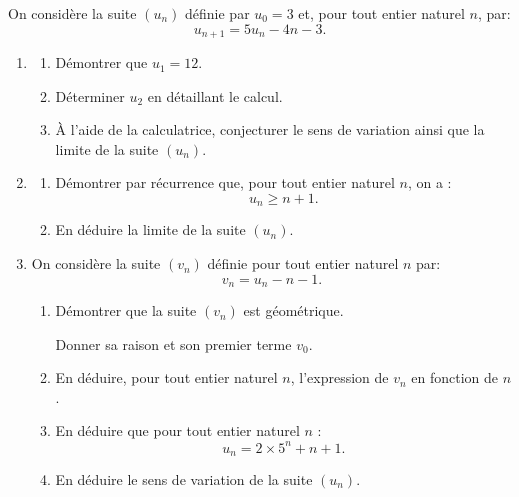 
\medskip

On considère la suite $\left(u_n\right)$ définie par $u_0 = 3$ et, pour tout entier naturel $n$, par:
\[u_{n+1} = 5u_n - 4n - 3.\]

\smallskip

\begin{enumerate}
\item 
	\begin{enumerate}
		\item Démontrer que $u_1 = 12$.
		\item Déterminer $u_2$ en détaillant le calcul.
		\item À l'aide de la calculatrice, conjecturer le sens de variation ainsi que la limite de la suite $\left(u_n\right)$.
	\end{enumerate}
\item 
	\begin{enumerate}
		\item Démontrer par récurrence que, pour tout entier naturel $n$, on a : \[u_n\geqslant n + 1.\]
		\item En déduire la limite de la suite $\left(u_n\right)$.
	\end{enumerate}
\item On considère la suite $\left(v_n\right)$ définie pour tout entier naturel $n$ par: \[v_n = u_n - n - 1.\]
	\begin{enumerate}
		\item Démontrer que la suite $\left(v_n\right)$ est géométrique.
		
Donner sa raison et son premier terme $v_0$.
		\item En déduire, pour tout entier naturel $n$, l'expression de $v_n$ en fonction de $n$.
		\item En déduire que pour tout entier naturel $n$ :
\[u_n = 2 \times 5^n + n + 1.\]
		\item En déduire le sens de variation de la suite $\left(u_n\right)$.
	\end{enumerate}



\end{enumerate}
